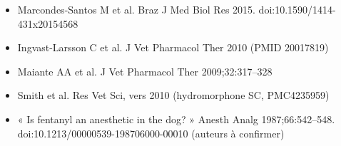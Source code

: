 \documentclass[10pt,a4paper]{article}
\begin{document}
\begin{itemize}
\item Marcondes-Santos M et al. Braz J Med Biol Res 2015. doi:10.1590/1414-431x20154568
\item Ingvast-Larsson C et al. J Vet Pharmacol Ther 2010 (PMID 20017819)
\item Maiante AA et al. J Vet Pharmacol Ther 2009;32:317--328
\item Smith et al. Res Vet Sci, vers 2010 (hydromorphone SC, PMC4235959)
\item « Is fentanyl an anesthetic in the dog? » Anesth Analg 1987;66:542--548. doi:10.1213/00000539-198706000-00010 (auteurs à confirmer)
\end{itemize}
\end{document}
